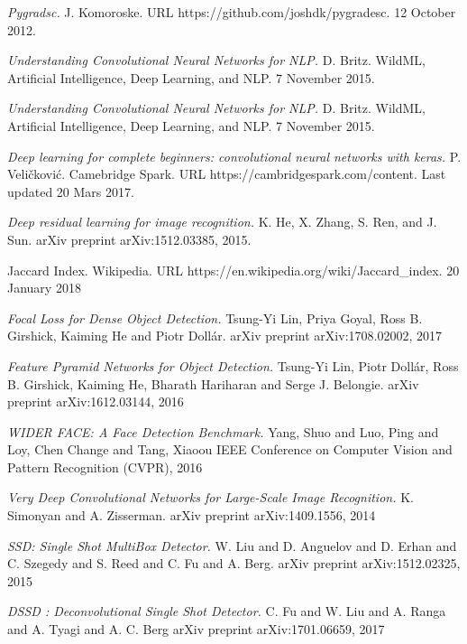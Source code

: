 \documentclass[a4paper,11pt,twoside]{article}
\begin{document}
\begin{thebibliography}{99}
	\textit{Pygradsc.}
	J. Komoroske.
	URL https://github.com/joshdk/pygradesc.
	12 October 2012.
	
	\textit{Understanding Convolutional Neural Networks for NLP.}
	D. Britz.
	WildML, Artificial Intelligence, Deep Learning, and NLP.
	7 November 2015.
	
	\textit{Understanding Convolutional Neural Networks for NLP.}
	D. Britz.
	WildML, Artificial Intelligence, Deep Learning, and NLP.
	7 November 2015.
	
	\textit{Deep learning for complete beginners: convolutional neural networks with keras.}
	P. Veličković.
	Camebridge Spark. 
	URL https://cambridgespark.com/content.
	Last updated 20 Mars 2017.


	\textit{Deep residual learning for image recognition.}
    K. He, X. Zhang, S. Ren, and J. Sun. 
    arXiv preprint arXiv:1512.03385, 2015.

	Jaccard Index. Wikipedia.
    URL https://en.wikipedia.org/wiki/Jaccard{\_}index. 
    20 January 2018
    
	\textit{Focal Loss for Dense Object Detection.}
	Tsung{-}Yi Lin,
    Priya Goyal,
    Ross B. Girshick,
    Kaiming He and
    Piotr Doll{\'{a}}r.
    arXiv preprint arXiv:1708.02002, 2017

	\textit{Feature Pyramid Networks for Object Detection.}
	Tsung{-}Yi Lin,
               Piotr Doll{\'{a}}r,
               Ross B. Girshick,
               Kaiming He,
               Bharath Hariharan and
               Serge J. Belongie.
    arXiv preprint arXiv:1612.03144, 2016
    
	\textit{WIDER FACE: A Face Detection Benchmark.}
	Yang, Shuo and Luo, Ping and Loy, Chen Change and Tang, Xiaoou
    IEEE Conference on Computer Vision and Pattern Recognition (CVPR), 2016
    
	\textit{Very Deep Convolutional Networks for Large-Scale Image Recognition.}
	K. Simonyan and
    A. Zisserman.
    arXiv preprint arXiv:1409.1556, 2014
    
	\textit{{SSD:} Single Shot MultiBox Detector.}
	W. Liu and
               D. Anguelov and
               D. Erhan and
               C. Szegedy and
               S. Reed and
               C. Fu and
               A. Berg.
    arXiv preprint arXiv:1512.02325, 2015

	\textit{{DSSD} : Deconvolutional Single Shot Detector.}
	C. Fu and
               W. Liu and
               A. Ranga and
               A. Tyagi and
               A. C. Berg
    arXiv preprint arXiv:1701.06659, 2017

\end{thebibliography}
\end{document}

